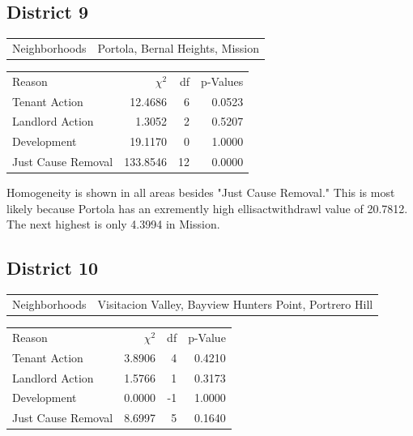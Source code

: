 \documentclass[]{article}
\begin{document}
\subsection{District 9}

\begin {table}[!h]
\centering
\begin{tabular}{l | l}
	Neighborhoods &  Portola, Bernal Heights, Mission
\end{tabular}
\begin{tabular}{l | r | r | r}
	
	Reason				 &  $\chi ^{2}$ & df & p-Values\\
	Tenant Action 		   & 12.4686   &  6 & 0.0523 \\
	Landlord Action	       &  1.3052  & 2  & 0.5207 \\
	Development			   &  19.1170  & 0  & 1.0000 \\
	Just Cause Removal	   &  133.8546  & 12  & 0.0000 \\
\end{tabular} \newline
\end{table}
\FloatBarrier

Homogeneity is shown in all areas besides "Just Cause Removal." This is most likely because Portola has an exremently high ellisactwithdrawl value of 20.7812. The next highest is only 4.3994 in Mission.  

\subsection{District 10}

\begin {table}[!h]
\centering
\begin{tabular}{l | l}
	Neighborhoods & Visitacion Valley, Bayview Hunters Point, Portrero Hill
\end{tabular}
\begin{tabular}{l | r | r | r}
	
	Reason				 &  $\chi ^{2}$ & df & p-Value \\
	Tenant Action 		   &  3.8906  &  4  & 0.4210 \\
	Landlord Action	       &  1.5766  &  1  & 0.3173 \\
	Development			   &  0.0000  &  -1  & 1.0000 \\
	Just Cause Removal	   &  8.6997  &  5  & 0.1640 \\
\end{tabular} \newline
\end{table}
\FloatBarrier
\end{document}
